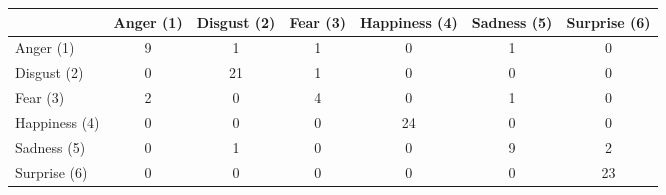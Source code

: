 \begin{center}
    \begin{tabular}{ | l || c | c | c | c | c | c | }
    \hline
          & Anger (1) & Disgust (2) & Fear (3) & Happiness (4) & Sadness (5) & Surprise (6) \\ \hline \hline
        Anger (1) & 9 & 1 & 1 & 0 & 1 & 0 \\ \hline
        Disgust (2) & 0 & 21 & 1 & 0 & 0 & 0 \\ \hline
        Fear (3) & 2 & 0 & 4 & 0 & 1 & 0 \\ \hline
        Happiness (4) & 0 & 0 & 0 & 24 & 0 & 0 \\ \hline
        Sadness (5) & 0 & 1 & 0 & 0 & 9 & 2 \\ \hline
        Surprise (6) & 0 & 0 & 0 & 0 & 0 & 23 \\ \hline
    \end{tabular}
\end{center}
